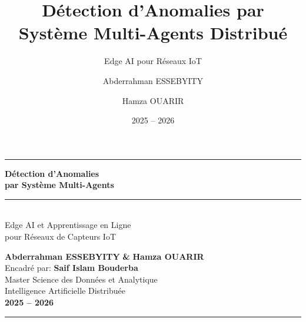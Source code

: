 \documentclass[aspectratio=169]{beamer}
\title[Détection d'Anomalies MAS]{Détection d'Anomalies par Système Multi-Agents Distribué}
\subtitle{Edge AI pour Réseaux IoT}
\author[A. ESSEBYITY  \& H. OUARIR ]{Abderrahman ESSEBYITY \and Hamza OUARIR}
\institute[Master SDA]{Master Science des Données et Analytique}
\date{2025 -- 2026}
\begin{document}
{
\begin{frame}[plain]
    \vspace{0.2cm}
    \begin{center}
        {\color{accent}\rule{0.7\paperwidth}{0.15cm}}
    \end{center}
    \vspace{1.2cm}
    
    \begin{center}
        {\Huge\bfseries\color{primary} Détection d'Anomalies}\\[0.25cm]
        {\Huge\bfseries\color{primary} par Système Multi-Agents}\\[0.7cm]
        {\color{accent}\rule{0.35\textwidth}{0.12cm}}\\[0.5cm]
        {\large\color{textcolor} Edge AI et Apprentissage en Ligne\\pour Réseaux de Capteurs IoT}
    \end{center}
    
    \vspace{1cm}
    
    \begin{center}
        {\large\textbf{Abderrahman ESSEBYITY} \quad \textbf{\&} \quad \textbf{Hamza OUARIR}}\\[0.35cm]
        {\normalsize Encadré par: \textbf{Saif Islam Bouderba}}\\[0.5cm]
        {\normalsize Master Science des Données et Analytique}\\
        {\normalsize Intelligence Artificielle Distribuée}\\[0.3cm]
        {\small \textbf{2025 -- 2026}}
    \end{center}
    
    \vspace{0.5cm}
    \begin{center}
        {\color{accent}\rule{0.7\paperwidth}{0.15cm}}
    \end{center}
\end{frame}
}
\end{document}
